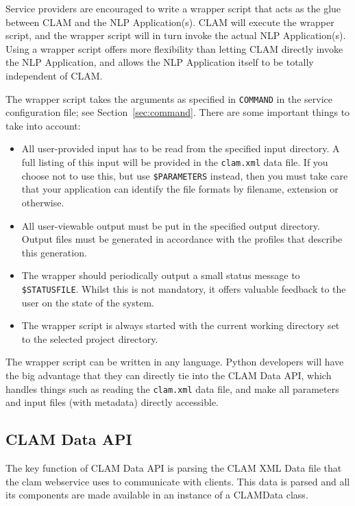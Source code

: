 \documentclass[a4paper,12pt]{report}
\begin{document}
Service providers are encouraged to write a wrapper script that acts as the glue between CLAM and the NLP Application(s). CLAM will execute the wrapper script, and the wrapper script will in turn invoke the actual NLP Application(s). Using a wrapper script offers more flexibility than letting CLAM directly invoke the NLP Application, and allows the NLP Application itself to be totally independent of CLAM. 

The wrapper script takes the arguments as specified in \texttt{COMMAND} in the service configuration file; see Section~\ref{sec:command}. There are some important things to take into account:

\begin{itemize}
\item All user-provided input has to be read from the specified input directory. A full listing of this input will be provided in the \texttt{clam.xml} data file. If you choose not to use this, but use \texttt{\$PARAMETERS} instead, then you must take care that your application can identify the file formats by filename, extension or otherwise.
\item All user-viewable output must be put in the specified output directory. Output files must be generated in accordance with the profiles that describe this generation. 
\item The wrapper should periodically output a small status message to \texttt{\$STATUSFILE}. Whilst this is not mandatory, it offers valuable feedback to the user on the state of the system. 
\item The wrapper script is always started with the current working directory set to the selected project directory.
\end{itemize}

The wrapper script can be written in any language. Python developers will have the big advantage that they can directly tie into the CLAM Data API, which handles things such as reading the \texttt{clam.xml} data file, and make all parameters and input files (with metadata) directly accessible.

\subsection{CLAM Data API}

The key function of CLAM Data API is parsing the CLAM XML Data file that the clam webservice uses to communicate with clients. This data is parsed and all its components are made available in an instance of a CLAMData class.
\end{document}
